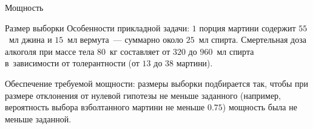 \documentclass[9pt,pdf,utf8,hyperref={unicode},aspectratio=169]{beamer}
\begin{document}
\begin{frame}{Мощность}
	
\end{frame}

\begin{frame}{Размер выборки}
% 
	Особенности прикладной задачи: $1$ порция мартини содержит $55$~мл джина и $15$~мл вермута~--- суммарно около $25$~мл спирта.
	Смертельная доза алкоголя при массе тела $80$~кг составляет от $320$ до $960$~мл спирта в~зависимости от толерантности (от $13$ до $38$ мартини).
	
	\bigskip
	
	Обеспечение требуемой мощности: размеры выборки подбирается так, чтобы при размере отклонения от нулевой гипотезы не меньше заданного (например, вероятность выбора взболтанного мартини не меньше $0.75$) мощность была не меньше заданной.
\end{frame}
\end{document}
